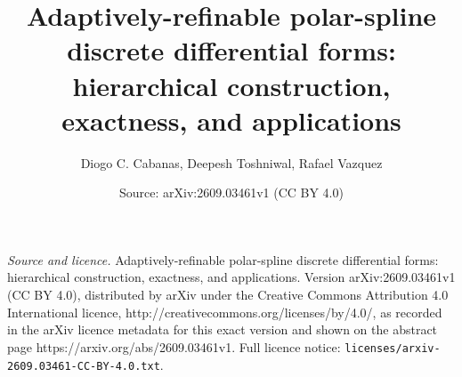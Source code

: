 \documentclass[10pt,a4paper]{amsart}
\title{Adaptively-refinable polar-spline discrete differential forms:\\ hierarchical construction, exactness, and applications}
\author{Diogo C. Cabanas, Deepesh Toshniwal, Rafael Vazquez}
\date{Source: arXiv:2609.03461v1 (CC BY 4.0)}
\begin{document}
\maketitle

\noindent\emph{Source and licence.} Adaptively-refinable polar-spline discrete differential forms:\\ hierarchical construction, exactness, and applications. Version arXiv:2609.03461v1 (CC BY 4.0), distributed by arXiv under the Creative Commons Attribution 4.0 International licence, http://creativecommons.org/licenses/by/4.0/, as recorded in the arXiv licence metadata for this exact version and shown on the abstract page https://arxiv.org/abs/2609.03461v1. Full licence notice: \texttt{licenses/arxiv-2609.03461-CC-BY-4.0.txt}.\par\smallskip
\end{document}
